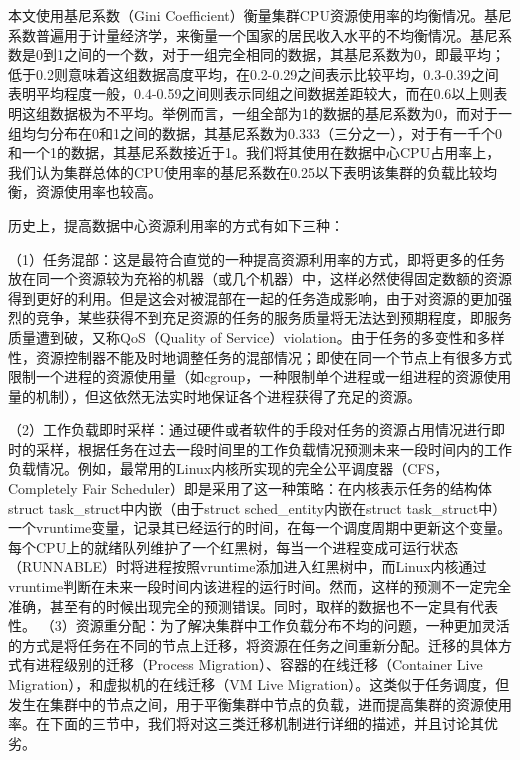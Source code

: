 本文使用基尼系数（Gini Coefficient）\cite{gini}衡量集群CPU资源使用率的均衡情况。基尼系数普遍用于计量经济学，来衡量一个国家的居民收入水平的不均衡情况。基尼系数是0到1之间的一个数，对于一组完全相同的数据，其基尼系数为0，即最平均；低于0.2则意味着这组数据高度平均，在0.2-0.29之间表示比较平均，0.3-0.39之间表明平均程度一般，0.4-0.59之间则表示同组之间数据差距较大，而在0.6以上则表明这组数据极为不平均。举例而言，一组全部为1的数据的基尼系数为0，而对于一组均匀分布在0和1之间的数据，其基尼系数为0.333（三分之一），对于有一千个0和一个1的数据，其基尼系数接近于1。我们将其使用在数据中心CPU占用率上，我们认为集群总体的CPU使用率的基尼系数在0.25以下表明该集群的负载比较均衡，资源使用率也较高。

历史上，提高数据中心资源利用率的方式有如下三种：

（1）任务混部：这是最符合直觉的一种提高资源利用率的方式，即将更多的任务放在同一个资源较为充裕的机器（或几个机器）中，这样必然使得固定数额的资源得到更好的利用。但是这会对被混部在一起的任务造成影响，由于对资源的更加强烈的竞争，某些获得不到充足资源的任务的服务质量将无法达到预期程度，即服务质量遭到破，又称QoS（Quality of Service）violation。由于任务的多变性和多样性，资源控制器不能及时地调整任务的混部情况；即使在同一个节点上有很多方式限制一个进程的资源使用量（如cgroup，一种限制单个进程或一组进程的资源使用量的机制），但这依然无法实时地保证各个进程获得了充足的资源。

（2）工作负载即时采样：通过硬件或者软件的手段对任务的资源占用情况进行即时的采样，根据任务在过去一段时间里的工作负载情况预测未来一段时间内的工作负载情况。例如，最常用的Linux内核所实现的完全公平调度器（CFS，Completely Fair Scheduler）即是采用了这一种策略：在内核表示任务的结构体struct task\_struct中内嵌（由于struct sched\_entity内嵌在struct task\_struct中）一个vruntime变量，记录其已经运行的时间，在每一个调度周期中更新这个变量。每个CPU上的就绪队列维护了一个红黑树，每当一个进程变成可运行状态（RUNNABLE）时将进程按照vruntime添加进入红黑树中，而Linux内核通过vruntime判断在未来一段时间内该进程的运行时间。然而，这样的预测不一定完全准确，甚至有的时候出现完全的预测错误。同时，取样的数据也不一定具有代表性。
\label{chap:reallocation}
（3）资源重分配：为了解决集群中工作负载分布不均的问题，一种更加灵活的方式是将任务在不同的节点上迁移，将资源在任务之间重新分配。迁移的具体方式有进程级别的迁移（Process Migration）、容器的在线迁移（Container Live Migration），和虚拟机的在线迁移（VM Live Migration）。这类似于任务调度，但发生在集群中的节点之间，用于平衡集群中节点的负载，进而提高集群的资源使用率。在下面的三节中，我们将对这三类迁移机制进行详细的描述，并且讨论其优劣。

